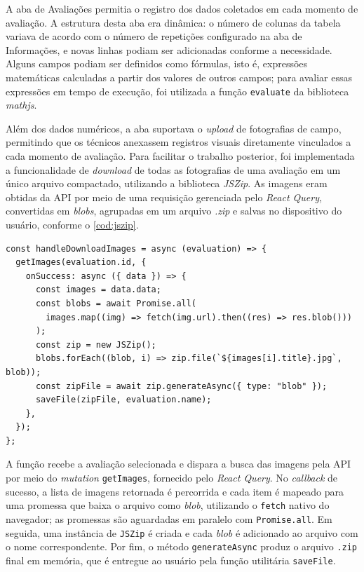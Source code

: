 A aba de Avaliações permitia o registro dos dados coletados em cada momento de avaliação. A estrutura desta aba era dinâmica: o número de colunas da tabela variava de acordo com o número de repetições configurado na aba de Informações, e novas linhas podiam ser adicionadas conforme a necessidade. Alguns campos podiam ser definidos como fórmulas, isto é, expressões matemáticas calculadas a partir dos valores de outros campos; para avaliar essas expressões em tempo de execução, foi utilizada a função \texttt{evaluate} da biblioteca \textit{mathjs}.

Além dos dados numéricos, a aba suportava o \textit{upload} de fotografias de campo, permitindo que os técnicos anexassem registros visuais diretamente vinculados a cada momento de avaliação. Para facilitar o trabalho posterior, foi implementada a funcionalidade de \textit{download} de todas as fotografias de uma avaliação em um único arquivo compactado, utilizando a biblioteca \textit{JSZip}. As imagens eram obtidas da API por meio de uma requisição gerenciada pelo \textit{React Query}, convertidas em \textit{blobs}, agrupadas em um arquivo \textit{.zip} e salvas no dispositivo do usuário, conforme o \autoref{cod:jszip}. 

\begin{lstlisting}[caption={Trecho do \textit{download} das fotografias de uma avaliação em arquivo \textit{.zip} com \textit{JSZip}.}, label={cod:jszip}]
const handleDownloadImages = async (evaluation) => {
  getImages(evaluation.id, {
    onSuccess: async ({ data }) => {
      const images = data.data;
      const blobs = await Promise.all(
        images.map((img) => fetch(img.url).then((res) => res.blob()))
      );
      const zip = new JSZip();
      blobs.forEach((blob, i) => zip.file(`${images[i].title}.jpg`, blob));
      const zipFile = await zip.generateAsync({ type: "blob" });
      saveFile(zipFile, evaluation.name);
    },
  });
};
\end{lstlisting}

A função recebe a avaliação selecionada e dispara a busca das imagens pela API por meio do \textit{mutation} \texttt{getImages}, fornecido pelo \textit{React Query}. No \textit{callback} de sucesso, a lista de imagens retornada é percorrida e cada item é mapeado para uma promessa que baixa o arquivo como \textit{blob}, utilizando o \texttt{fetch} nativo do navegador; as promessas são aguardadas em paralelo com \texttt{Promise.all}. Em seguida, uma instância de \texttt{JSZip} é criada e cada \textit{blob} é adicionado ao arquivo com o nome correspondente. Por fim, o método \texttt{generateAsync} produz o arquivo \texttt{.zip} final em memória, que é entregue ao usuário pela função utilitária \texttt{saveFile}.

